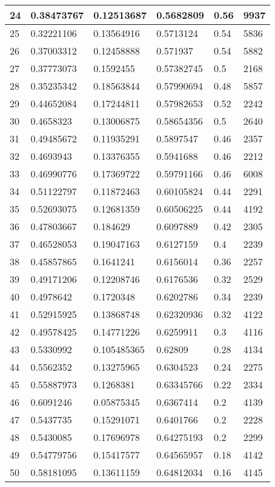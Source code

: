 \begin{longtable}{|l|l|l|l|l|l|}
24 & 0.38473767 & 0.12513687 & 0.5682809 & 0.56 & 9937 \\ \hline 
25 & 0.32221106 & 0.13564916 & 0.5713124 & 0.54 & 5836 \\ \hline 
26 & 0.37003312 & 0.12458888 & 0.571937 & 0.54 & 5882 \\ \hline 
27 & 0.37773073 & 0.1592455 & 0.57382745 & 0.5 & 2168 \\ \hline 
28 & 0.35235342 & 0.18563844 & 0.57990694 & 0.48 & 5857 \\ \hline 
29 & 0.44652084 & 0.17244811 & 0.57982653 & 0.52 & 2242 \\ \hline 
30 & 0.4658323 & 0.13006875 & 0.58654356 & 0.5 & 2640 \\ \hline 
31 & 0.49485672 & 0.11935291 & 0.5897547 & 0.46 & 2357 \\ \hline 
32 & 0.4693943 & 0.13376355 & 0.5941688 & 0.46 & 2212 \\ \hline 
33 & 0.46990776 & 0.17369722 & 0.59791166 & 0.46 & 6008 \\ \hline 
34 & 0.51122797 & 0.11872463 & 0.60105824 & 0.44 & 2291 \\ \hline 
35 & 0.52693075 & 0.12681359 & 0.60506225 & 0.44 & 4192 \\ \hline 
36 & 0.47803667 & 0.184629 & 0.6097889 & 0.42 & 2305 \\ \hline 
37 & 0.46528053 & 0.19047163 & 0.6127159 & 0.4 & 2239 \\ \hline 
38 & 0.45857865 & 0.1641241 & 0.6156014 & 0.36 & 2257 \\ \hline 
39 & 0.49171206 & 0.12208746 & 0.6176536 & 0.32 & 2529 \\ \hline 
40 & 0.4978642 & 0.1720348 & 0.6202786 & 0.34 & 2239 \\ \hline 
41 & 0.52915925 & 0.13868748 & 0.62320936 & 0.32 & 4122 \\ \hline 
42 & 0.49578425 & 0.14771226 & 0.6259911 & 0.3 & 4116 \\ \hline 
43 & 0.5330992 & 0.105485365 & 0.62809 & 0.28 & 4134 \\ \hline 
44 & 0.5562352 & 0.13275965 & 0.6304523 & 0.24 & 2275 \\ \hline 
45 & 0.55887973 & 0.1268381 & 0.63345766 & 0.22 & 2334 \\ \hline 
46 & 0.6091246 & 0.05875345 & 0.6367414 & 0.2 & 4139 \\ \hline 
47 & 0.5437735 & 0.15291071 & 0.6401766 & 0.2 & 2228 \\ \hline 
48 & 0.5430085 & 0.17696978 & 0.64275193 & 0.2 & 2299 \\ \hline 
49 & 0.54779756 & 0.15417577 & 0.64565957 & 0.18 & 4142 \\ \hline 
50 & 0.58181095 & 0.13611159 & 0.64812034 & 0.16 & 4145 \\ \hline 
\end{longtable}